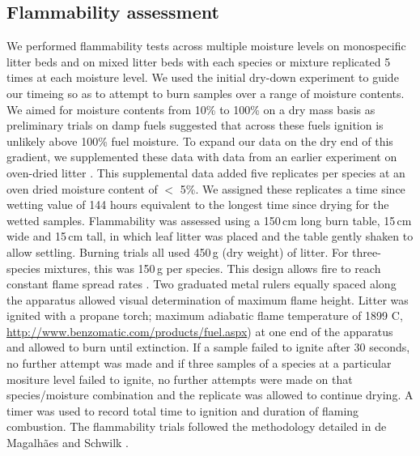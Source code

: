 \documentclass[fire,article,submit,moreauthors,pdftex]{Definitions/mdpi}
\begin{document}
\subsection{Flammability assessment}

We performed flammability tests across multiple moisture levels on monospecific
litter beds and on mixed litter beds with each species or mixture replicated 5
times at each moisture level. We used the initial dry-down experiment to guide
our timeing so as to attempt to burn samples over a range of moisture contents.
We aimed for moisture contents from 10\% to 100\% on a dry mass basis as
preliminary trials on damp fuels suggested that across these fuels ignition is
unlikely above 100\% fuel moisture. To expand our data on the dry end of this
gradient, we supplemented these data with data from an earlier experiment on
oven-dried litter \cite{Magalhaes+Schwilk-2012}. This supplemental data added
five replicates per species at an oven dried moisture content of $<$ 5\%. We
assigned these replicates a time since wetting value of 144 hours equivalent to
the longest time since drying for the wetted samples. Flammability was assessed
using a 150\,cm long burn table, 15\,cm wide and 15\,cm tall, in which leaf
litter was placed and the table gently shaken to allow settling. Burning trials
all used 450\,g (dry weight) of litter. For three-species mixtures, this was
150\,g per species. This design allows fire to reach constant flame spread
rates \cite{Magalhaes+Schwilk-2012}. Two graduated metal rulers equally spaced
along the apparatus allowed visual determination of maximum flame height.
Litter was ignited with a propane torch; maximum adiabatic flame temperature of
1899 C, \url{http://www.benzomatic.com/products/fuel.aspx}) at one end of the
apparatus and allowed to burn until extinction. If a sample failed to ignite after 30 seconds, no further attempt was made and if three samples of a species at a particular mositure level failed to ignite, no further attempts were made on that species/moisture combination and the replicate was allowed to continue drying. A timer was used to record total time to ignition and duration of flaming combustion. The flammability trials followed the methodology detailed in de
Magalhães and Schwilk \cite{Magalhaes+Schwilk-2012}.

 
\end{document}

